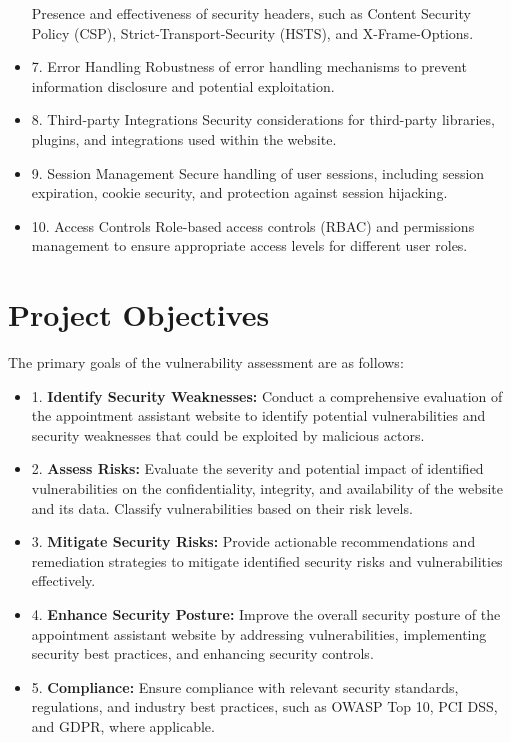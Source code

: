 \documentclass[openany]{report}
\begin{document}
\begin{itemize}
          Presence and effectiveness of security headers, such as Content Security Policy (CSP), Strict-Transport-Security (HSTS), and X-Frame-Options.
    \item 7. Error Handling
          Robustness of error handling mechanisms to prevent information disclosure and potential exploitation.
    \item 8. Third-party Integrations
          Security considerations for third-party libraries, plugins, and integrations used within the website.
    \item 9. Session Management
          Secure handling of user sessions, including session expiration, cookie security, and protection against session hijacking.
    \item 10. Access Controls
          Role-based access controls (RBAC) and permissions management to ensure appropriate access levels for different user roles.
\end{itemize}

\section{Project Objectives}
The primary goals of the vulnerability assessment are as follows:
\begin{itemize}
    \item 1. \textbf{Identify Security Weaknesses:} Conduct a comprehensive evaluation of the appointment assistant website to identify potential vulnerabilities and security weaknesses that could be exploited by malicious actors.
    \item 2. \textbf{Assess Risks:} Evaluate the severity and potential impact of identified vulnerabilities on the confidentiality, integrity, and availability of the website and its data. Classify vulnerabilities based on their risk levels.
    \item 3. \textbf{Mitigate Security Risks:} Provide actionable recommendations and remediation strategies to mitigate identified security risks and vulnerabilities effectively.
    \item 4. \textbf{Enhance Security Posture:} Improve the overall security posture of the appointment assistant website by addressing vulnerabilities, implementing security best practices, and enhancing security controls.
    \item 5. \textbf{Compliance:} Ensure compliance with relevant security standards, regulations, and industry best practices, such as OWASP Top 10, PCI DSS, and GDPR, where applicable.
\end{itemize}
\end{document}

